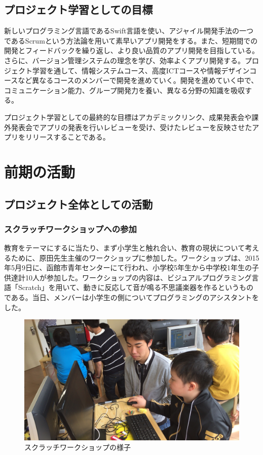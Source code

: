 \documentclass[openany,11pt,papersize]{jsbook}
\begin{document}
\section{プロジェクト学習としての目標}
新しいプログラミング言語であるSwift言語を使い、アジャイル開発手法の一つであるScrumという方法論を用いて素早いアプリ開発をする。また、短期間での開発とフィードバックを繰り返し、より良い品質のアプリ開発を目指している。さらに、バージョン管理システムの理念を学び、効率よくアプリ開発する。プロジェクト学習を通して、情報システムコース、高度ICTコースや情報デザインコースなど異なるコースのメンバーで開発を進めていく。開発を進めていく中で、コミュニケーション能力、グループ開発力を養い、異なる分野の知識を吸収する。
\par
プロジェクト学習としての最終的な目標はアカデミックリンク、成果発表会や課外発表会でアプリの発表を行いレビューを受け、受けたレビューを反映させたアプリをリリースすることである。

\chapter{前期の活動}

\section{プロジェクト全体としての活動}

\subsection{スクラッチワークショップへの参加}
\par 教育をテーマにするに当たり、まず小学生と触れ合い、教育の現状について考えるために、原田先生主催のワークショップに参加した。ワークショップは、2015年5月9日に、函館市青年センターにて行われ、小学校5年生から中学校1年生の子供達計10人が参加した。ワークショップの内容は、ビジュアルプログラミング言語「Scratch」を用いて、動きに反応して音が鳴る不思議楽器を作るというものである。当日、メンバーは小学生の側についてプログラミングのアシスタントをした。

\begin{figure}[H]
\begin{center}
\includegraphics[width=14cm, bb=0 0 1920 1080]{img/20150509_workshop.jpg}
\end{center}
\caption{スクラッチワークショップの様子}
\end{figure}
\end{document}
